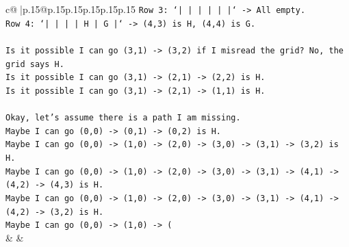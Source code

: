 \documentclass{article}
\begin{document}
{\begin{supertabular}{c@{$\;$}|p{.15\linewidth}@{}p{.15\linewidth}p{.15\linewidth}p{.15\linewidth}p{.15\linewidth}p{.15\linewidth}}
{{{\texttt{Row 3: `|     |     |     |     |     |` {-}> All empty.} \\
\texttt{Row 4: `|     |     |     |  H  |  G  |` {-}> (4,3) is H, (4,4) is G.} \\
\\ 
\texttt{Is it possible I can go (3,1) {-}> (3,2) if I misread the grid? No, the grid says H.} \\
\texttt{Is it possible I can go (3,1) {-}> (2,1) {-}> (2,2) is H.} \\
\texttt{Is it possible I can go (3,1) {-}> (2,1) {-}> (1,1) is H.} \\
\\ 
\texttt{Okay, let's assume there is a path I am missing.} \\
\texttt{Maybe I can go (0,0) {-}> (0,1) {-}> (0,2) is H.} \\
\texttt{Maybe I can go (0,0) {-}> (1,0) {-}> (2,0) {-}> (3,0) {-}> (3,1) {-}> (3,2) is H.} \\
\texttt{Maybe I can go (0,0) {-}> (1,0) {-}> (2,0) {-}> (3,0) {-}> (3,1) {-}> (4,1) {-}> (4,2) {-}> (4,3) is H.} \\
\texttt{Maybe I can go (0,0) {-}> (1,0) {-}> (2,0) {-}> (3,0) {-}> (3,1) {-}> (4,1) {-}> (4,2) {-}> (3,2) is H.} \\
\texttt{Maybe I can go (0,0) {-}> (1,0) {-}> (} \\
            }
        }
    }
    & & \\ \\


\end{supertabular}}
\end{document}
